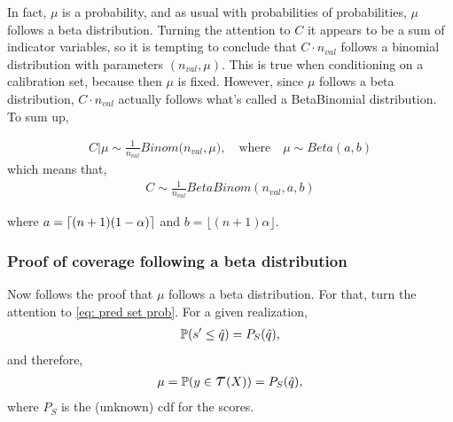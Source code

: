 In fact, $\mu$ is a probability, and as usual with probabilities of probabilities, $\mu$ follows a beta distribution. Turning the attention to $C$ it appears to be a sum of indicator variables, so it is tempting to conclude that $C\cdot n_{val}$ follows a binomial distribution with parameters $(n_{val}, \mu)$. This is true when conditioning on a calibration set, because then $\mu$ is fixed. However, since $\mu$ follows a beta distribution, $C\cdot n_{val}$ actually follows what's called a BetaBinomial distribution. To sum up,

\begin{gather}
    C|\mu \sim \frac 1{n_{val}} Binom\big(n_{val},\mu\big),
    \quad \text{where} \quad
    \mu \sim Beta(a, b)
\end{gather}
which means that,
\begin{gather}
    C \sim \frac 1{n_{val}} BetaBinom(n_{val}, a, b)
\end{gather}

where $a = \lceil {(n+1)(1-\alpha)} \rceil$ and $b=\lfloor(n+1)\alpha\rfloor$.

\subsubsection*{Proof of coverage following a beta distribution}
Now follows the proof that $\mu$ follows a beta distribution. For that, turn the attention to \cref{eq: pred set prob}. For a given realization,
\begin{gather*}
    \operatorname*{\mathbb{P}}(s'\leq \hat q) = P_S(\hat q),
\end{gather*}
and therefore,
\begin{gather*}
    \mu = \doubleP(y\in\Tau(X)) = P_S(\hat q),
\end{gather*}
where $P_S$ is the (unknown) cdf for the scores.

